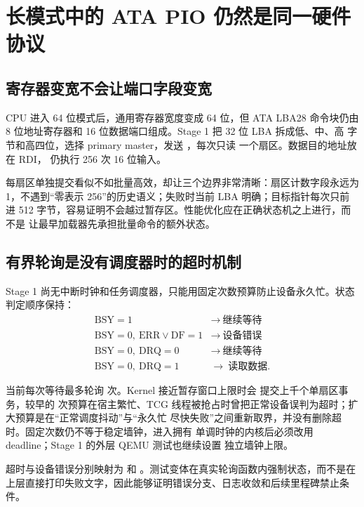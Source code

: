 \section{长模式中的 ATA PIO 仍然是同一硬件协议}

\subsection{寄存器变宽不会让端口字段变宽}

CPU 进入 64 位模式后，通用寄存器宽度变成 64 位，但 ATA LBA28 命令块仍由
8 位地址寄存器和 16 位数据端口组成。Stage 1 把 32 位 LBA 拆成低、中、高
字节和高四位，选择 primary master，发送 ，每次只读
一个扇区。数据目的地址放在 RDI， 仍执行 256 次 16 位输入。

每扇区单独提交看似不如批量高效，却让三个边界非常清晰：扇区计数字段永远为
1，不遇到“零表示 256”的历史语义；失败时当前 LBA 明确；目标指针每次只前进
512 字节，容易证明不会越过暂存区。性能优化应在正确状态机之上进行，而不是
让最早加载器先承担批量命令的额外状态。

\subsection{有界轮询是没有调度器时的超时机制}

Stage 1 尚无中断时钟和任务调度器，只能用固定次数预算防止设备永久忙。状态
判定顺序保持：
\[
\begin{array}{ll}
\mathrm{BSY}=1 & \rightarrow\ \text{继续等待}\\
\mathrm{BSY}=0,\ \mathrm{ERR}\lor\mathrm{DF}=1
  & \rightarrow\ \text{设备错误}\\
\mathrm{BSY}=0,\ \mathrm{DRQ}=0 & \rightarrow\ \text{继续等待}\\
\mathrm{BSY}=0,\ \mathrm{DRQ}=1 & \rightarrow\ \text{读取数据}.
\end{array}
\]

当前每次等待最多轮询  次。Kernel 接近暂存窗口上限时会
提交上千个单扇区事务，较早的  次预算在宿主繁忙、TCG
线程被抢占时曾把正常设备误判为超时；扩大预算是在“正常调度抖动”与“永久忙
尽快失败”之间重新取界，并没有删除超时。固定次数仍不等于稳定墙钟，进入拥有
单调时钟的内核后必须改用 deadline；Stage 1 的外层 QEMU 测试也继续设置
独立墙钟上限。

超时与设备错误分别映射为  和
。测试变体在真实轮询函数内强制状态，而不是在
上层直接打印失败文字，因此能够证明错误分支、日志收敛和后续里程碑禁止条件。


